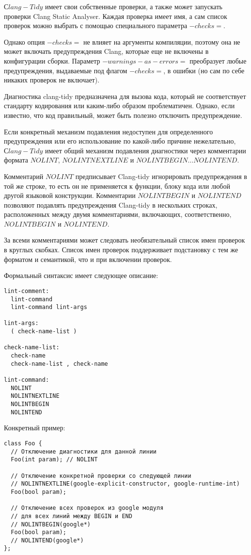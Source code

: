\documentclass{mipt-thesis-bs}
\begin{document}
$Сlang-Tidy$ имеет свои собственные проверки, а также может запускать 
проверки Clang Static Analyser. Каждая проверка имеет имя, 
а сам список проверок можно выбрать с помощью специального параметра $-checks=$.

Однако опция $-checks=$ не влияет на аргументы компиляции, поэтому она 
не может включать предупреждения Clang, которые еще не включены в 
конфигурации сборки. Параметр $-warnings-as-errors=$ преобразует 
любые предупреждения, выдаваемые под флагом $-checks=$, в ошибки 
(но сам по себе никаких проверок не включает).

Диагностика clang-tidy предназначена для вызова кода, который не 
соответствует стандарту кодирования или каким-либо образом проблематичен. 
Однако, если известно, что код правильный, может быть полезно отключить предупреждение.

Если конкретный механизм подавления недоступен для определенного 
предупреждения или его использование по какой-либо причине 
нежелательно, $Сlang-Tidy$ имеет общий механизм подавления 
диагностики через комментарии формата $NOLINT$,
$NOLINTNEXTLINE$ и $NOLINTBEGIN… NOLINTEND$.

Комментарий $NOLINT$ предписывает Clang-tidy игнорировать предупреждения 
в той же строке, то есть он не применяется к функции, блоку кода или любой 
другой языковой конструкции.
Комментарии $NOLINTBEGIN$ и $NOLINTEND$ позволяют подавлять предупреждения 
Clang-tidy в нескольких строках, расположенных между двумя 
комментариями, включающих, соответственно, $NOLINTBEGIN$ и $NOLINTEND$.

За всеми комментариями может следовать необязательный список имен 
проверок в круглых скобках. 
Список имен проверок поддерживает подстановку с тем же форматом 
и семантикой, что и при включении проверок.

Формальный синтаксис имеет следующее описание:
\begin{verbatim}
lint-comment:
  lint-command
  lint-command lint-args

lint-args:
  ( check-name-list )

check-name-list:
  check-name
  check-name-list , check-name

lint-command:
  NOLINT
  NOLINTNEXTLINE
  NOLINTBEGIN
  NOLINTEND
\end{verbatim}

Конкретный пример:

\begin{verbatim}
class Foo {
  // Отключение диагностики для данной линии
  Foo(int param); // NOLINT

  // Отключение конкретной проверки со следующей линии
  // NOLINTNEXTLINE(google-explicit-constructor, google-runtime-int)
  Foo(bool param);

  // Отключение всех проверок из google модуля
  // для всех линий между BEGIN и END
  // NOLINTBEGIN(google*)
  Foo(bool param);
  // NOLINTEND(google*)
};
\end{verbatim}
\end{document}
